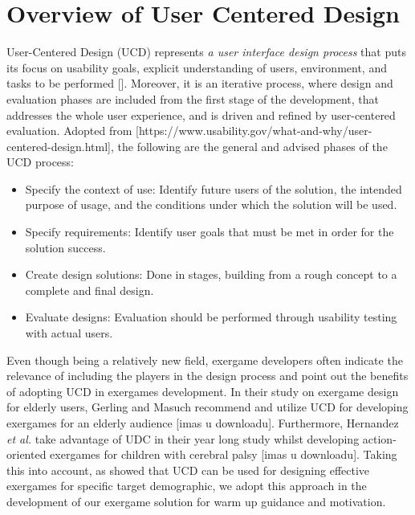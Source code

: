 \section{Overview of User Centered Design}
User-Centered Design (UCD) represents \textit{a user interface design process} that puts its focus on usability goals, explicit understanding of users, environment, and tasks to be performed []. Moreover, it is an iterative process, where design and evaluation phases are included from the first stage of the development, that addresses the whole user experience, and is driven and refined by user-centered evaluation. %
Adopted from [https://www.usability.gov/what-and-why/user-centered-design.html], the following are the general and advised phases of the UCD process:
\begin{itemize}
\item Specify the context of use: Identify future users of the solution, the intended purpose of usage, and the conditions under which the solution will be used.
\item Specify requirements: Identify user goals that must be met in order for the solution success.
\item Create design solutions: Done in stages, building from a rough concept to a complete and final design.
\item Evaluate designs: Evaluation should be performed through usability testing with actual users.
\end{itemize}
Even though being a relatively new field, exergame developers often indicate the relevance of including the players in the design process and point out the benefits of adopting UCD in exergames development. In their study on exergame design for elderly users, Gerling and Masuch recommend and utilize UCD for developing exergames for an elderly audience [imas u downloadu]. Furthermore, Hernandez \textit{et al.} take advantage of UDC in their year long study whilst developing action-oriented exergames for children with cerebral palsy [imas u downloadu]. Taking this into account, as showed that UCD can be used for designing effective exergames for specific target demographic, we adopt this approach in the development of our exergame solution for warm up guidance and motivation.

